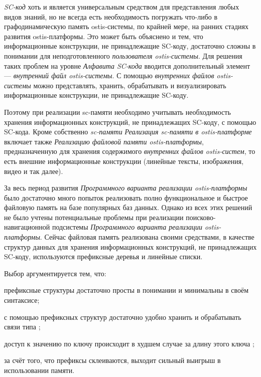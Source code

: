 \bigskip

\textit{SC-код} хоть и является универсальным средством для представления любых видов знаний, но не всегда есть необходимость погружать что-либо в графодинамическую память ostis-системы, по крайней мере, на ранних стадиях развития ostis-платформы. Это может быть объяснено и тем, что информационные конструкции, не принадлежащие SC-коду, достаточно сложны в понимании для неподготовленного \textit{пользователя ostis-системы}. Для решения таких проблем на уровне \textit{Алфавита SC-кода\scnsupergroupsign} вводится дополнительный элемент --- \textit{внутренний файл ostis-системы}. С помощью \textit{внутренних файлов ostis-системы} можно представлять, хранить, обрабатывать и визуализировать информационные конструкции, не принадлежащие SC-коду.

Поэтому при реализации sc-памяти необходимо учитывать необходимость хранения информационных конструкций, не принадлежащих SC-коду, с помощью SC-кода. Кроме собственно \textit{sc-памяти} \textit{Реализация sc-памяти в ostis-платформе} включает также \textit{Реализацию файловой памяти ostis-платформы}, предназначенную для хранения содержимого \textit{внутренних файлов ostis-систем}, то есть внешние информационные конструкции (линейные тексты, изображения, видео и так далее).

За весь период развития \textit{Программного варианта реализации ostis-платформы} было достаточно много попыток реализовать полно функциональное и быстрое файловую память на базе популярных баз данных. Однако из всех этих решений не было учтены потенциальные проблемы при реализации поисково-навигационной подсистемы \textit{Программного варианта реализации ostis-платформы}. Сейчас файловая память реализована своими средствами, в качестве структур данных для хранения информационных конструкций, не принадлежащих SC-коду, используются префиксные деревья  и линейные списки.

Выбор аргументируется тем, что:
\begin{textitemize}
    \item префиксные структуры достаточно просты в понимании и минимальны в своём синтаксисе;
    \item с помощью префиксных структур достаточно удобно хранить и обрабатывать связи типа ;
    \item доступ к значению по ключу происходит в худшем случае за длину этого ключа ;
    \item за счёт того, что префиксы склеиваются, выходит сильный выигрыш в использовании памяти.
\end{textitemize}

